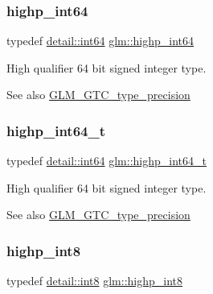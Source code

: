 \subsubsection{\texorpdfstring{highp\+\_\+int64}{highp\_int64}}
{\footnotesize\ttfamily typedef \mbox{\hyperlink{namespaceglm_1_1detail_a5b1c3227ec636c24a0676746381adfc8}{detail\+::int64}} \mbox{\hyperlink{group__gtc__type__precision_ga7ffb27943e9569800979081bc548621c}{glm\+::highp\+\_\+int64}}}

High qualifier 64 bit signed integer type. \begin{DoxySeeAlso}{See also}
\mbox{\hyperlink{group__gtc__type__precision}{G\+L\+M\+\_\+\+G\+T\+C\+\_\+type\+\_\+precision}} 
\end{DoxySeeAlso}
\mbox{\label{group__gtc__type__precision_ga0f5186bde44471133b08057cae8a51ac}} 
\subsubsection{\texorpdfstring{highp\+\_\+int64\+\_\+t}{highp\_int64\_t}}
{\footnotesize\ttfamily typedef \mbox{\hyperlink{namespaceglm_1_1detail_a5b1c3227ec636c24a0676746381adfc8}{detail\+::int64}} \mbox{\hyperlink{group__gtc__type__precision_ga0f5186bde44471133b08057cae8a51ac}{glm\+::highp\+\_\+int64\+\_\+t}}}

High qualifier 64 bit signed integer type. \begin{DoxySeeAlso}{See also}
\mbox{\hyperlink{group__gtc__type__precision}{G\+L\+M\+\_\+\+G\+T\+C\+\_\+type\+\_\+precision}} 
\end{DoxySeeAlso}
\mbox{\label{group__gtc__type__precision_ga57c86999e666760c304453f9bfdc09d1}} 
\subsubsection{\texorpdfstring{highp\+\_\+int8}{highp\_int8}}
{\footnotesize\ttfamily typedef \mbox{\hyperlink{namespaceglm_1_1detail_a04b526a8d7a9b455602a0afa78c531e0}{detail\+::int8}} \mbox{\hyperlink{group__gtc__type__precision_ga57c86999e666760c304453f9bfdc09d1}{glm\+::highp\+\_\+int8}}}

